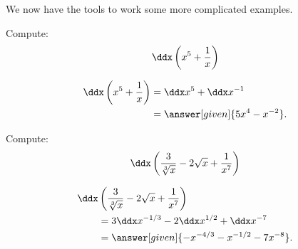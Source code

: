\documentclass{ximera}
\begin{document}
We now have the tools to work some more complicated examples. 


\begin{example}
Compute:
\[
\ddx \left( x^5+\frac{1}{x}\right)
\] 
\begin{explanation}
\begin{align*}
\ddx \left(x^5+\frac{1}{x}\right) &= \ddx x^5 + \ddx x^{-1} \\
&=\answer[given]{5x^4 - x^{-2}}.
\end{align*}
\end{explanation}
\end{example}

\begin{example}
Compute:
\[
\ddx \left(\frac{3}{\sqrt[3]{x}}-2\sqrt{x}+\frac{1}{x^7}\right)
\]
\begin{explanation}
\begin{align*}
  \ddx &\left(\frac{3}{\sqrt[3]{x}}-2\sqrt{x}+\frac{1}{x^7}\right)\\
  &= 3\ddx x^{-1/3} -2\ddx x^{1/2}+\ddx x^{-7}\\
  &=\answer[given]{-x^{-4/3} - x^{-1/2}-7x^{-8}}.
\end{align*}
\end{explanation}
\end{example}
\end{document}
